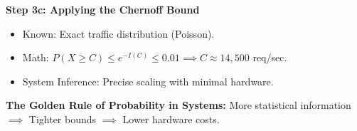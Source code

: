 \documentclass[11pt]{article}
\begin{document}
\textbf{Step 3c: Applying the Chernoff Bound}
\begin{itemize}
    \item Known: Exact traffic distribution (Poisson).
    \item Math: $P(X \ge C) \le e^{-I(C)} \le 0.01 \implies C \approx 14,500$ req/sec.
    \item System Inference: Precise scaling with minimal hardware.
\end{itemize}

\textbf{The Golden Rule of Probability in Systems:} 
More statistical information $\implies$ Tighter bounds $\implies$ Lower hardware costs.
\end{document}
